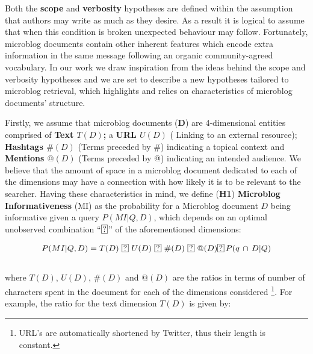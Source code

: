 Both the \textbf{scope} and \textbf{verbosity} hypotheses are defined within the assumption that authors may write as much as they desire. As a result it is logical to assume that when this condition is broken unexpected behaviour may follow. Fortunately, microblog documents contain other inherent features which encode extra information in the same message following an organic community-agreed vocabulary. In our work we draw inspiration from the ideas behind the scope and verbosity hypotheses and we are set to describe a new hypotheses tailored to microblog retrieval, which highlights and relies on characteristics of microblog documents' structure. 






Firstly, we assume that microblog documents (\textbf{D}) are 4-dimensional entities comprised of \textbf{Text \(T(D)\);} a \textbf{URL \(U(D)\)} ( Linking to an external resource); \textbf{Hashtags \(\#(D)\)} (Terms preceded by \#) indicating a topical context and \textbf{Mentions \(@(D)\)} (Terms preceded by @) indicating an intended audience. We believe that the amount of space in a microblog document dedicated to each of the dimensions may have a connection with how likely it is to be relevant to the searcher. Having these characteristics in mind, we define (\textbf{H1}) \textbf{Microblog Informativeness} (MI) as the probability for a Microblog document \(D\) being informative given a query \(P(MI|Q,D)\), which depends on an optimal unobserved combination ``\(\circled{?}\)'' of the aforementioned dimensions:



\begin{equation}
 P(MI|Q,D) =  T(D)~ \circled{?}~  U(D)~  \circled{?}~  \#(D)~  \circled{?}~  @(D) \circled{?}\, P(q\, \cap\, D | Q) %
\end{equation} \\





\noindent where \(T(D)\), \(U(D)\), \(\#(D)\) and \(@(D)\) are the ratios in terms of number of characters spent in the document for each of the dimensions considered \footnote{URL's are automatically shortened by Twitter, thus their length is constant.}. For example, the ratio for the text dimension  \(T(D)\) is given by:



